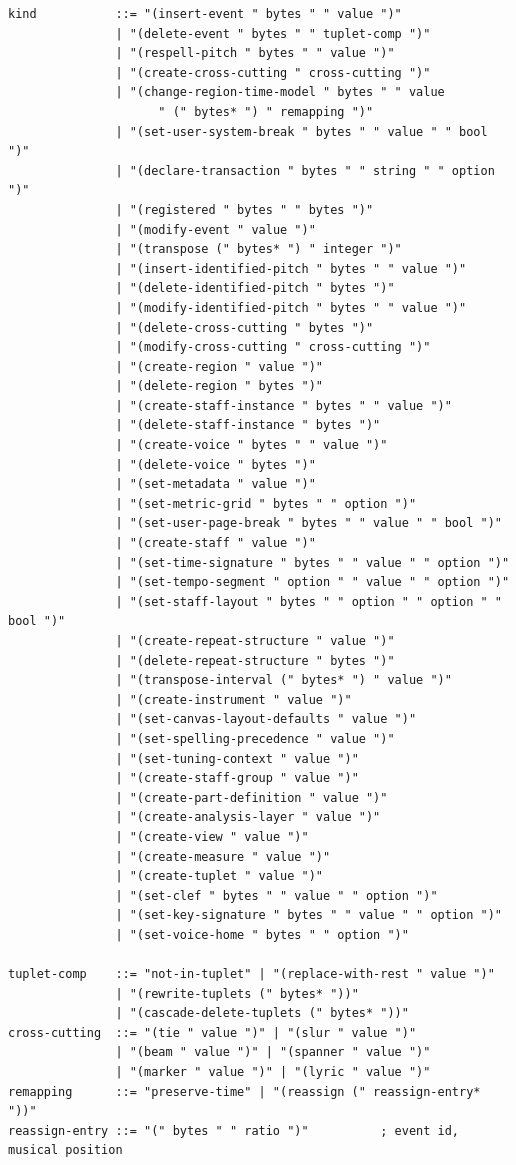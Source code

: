\documentclass[11pt,letterpaper]{report}
\begin{document}
\begin{lstlisting}
kind           ::= "(insert-event " bytes " " value ")"
               | "(delete-event " bytes " " tuplet-comp ")"
               | "(respell-pitch " bytes " " value ")"
               | "(create-cross-cutting " cross-cutting ")"
               | "(change-region-time-model " bytes " " value
                     " (" bytes* ") " remapping ")"
               | "(set-user-system-break " bytes " " value " " bool ")"
               | "(declare-transaction " bytes " " string " " option ")"
               | "(registered " bytes " " bytes ")"
               | "(modify-event " value ")"
               | "(transpose (" bytes* ") " integer ")"
               | "(insert-identified-pitch " bytes " " value ")"
               | "(delete-identified-pitch " bytes ")"
               | "(modify-identified-pitch " bytes " " value ")"
               | "(delete-cross-cutting " bytes ")"
               | "(modify-cross-cutting " cross-cutting ")"
               | "(create-region " value ")"
               | "(delete-region " bytes ")"
               | "(create-staff-instance " bytes " " value ")"
               | "(delete-staff-instance " bytes ")"
               | "(create-voice " bytes " " value ")"
               | "(delete-voice " bytes ")"
               | "(set-metadata " value ")"
               | "(set-metric-grid " bytes " " option ")"
               | "(set-user-page-break " bytes " " value " " bool ")"
               | "(create-staff " value ")"
               | "(set-time-signature " bytes " " value " " option ")"
               | "(set-tempo-segment " option " " value " " option ")"
               | "(set-staff-layout " bytes " " option " " option " " bool ")"
               | "(create-repeat-structure " value ")"
               | "(delete-repeat-structure " bytes ")"
               | "(transpose-interval (" bytes* ") " value ")"
               | "(create-instrument " value ")"
               | "(set-canvas-layout-defaults " value ")"
               | "(set-spelling-precedence " value ")"
               | "(set-tuning-context " value ")"
               | "(create-staff-group " value ")"
               | "(create-part-definition " value ")"
               | "(create-analysis-layer " value ")"
               | "(create-view " value ")"
               | "(create-measure " value ")"
               | "(create-tuplet " value ")"
               | "(set-clef " bytes " " value " " option ")"
               | "(set-key-signature " bytes " " value " " option ")"
               | "(set-voice-home " bytes " " option ")"

tuplet-comp    ::= "not-in-tuplet" | "(replace-with-rest " value ")"
               | "(rewrite-tuplets (" bytes* "))"
               | "(cascade-delete-tuplets (" bytes* "))"
cross-cutting  ::= "(tie " value ")" | "(slur " value ")"
               | "(beam " value ")" | "(spanner " value ")"
               | "(marker " value ")" | "(lyric " value ")"
remapping      ::= "preserve-time" | "(reassign (" reassign-entry* "))"
reassign-entry ::= "(" bytes " " ratio ")"          ; event id, musical position


\end{lstlisting}
\end{document}
